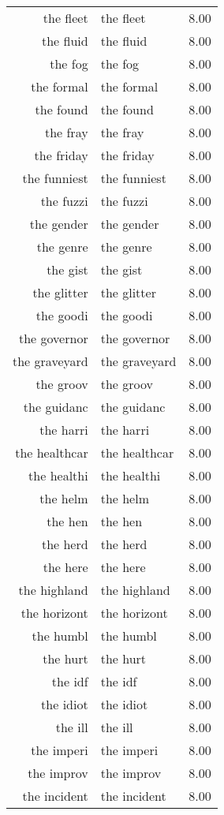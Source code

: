 \begin{table}[ht]
\begin{tabular}{rlr}
  the fleet & the fleet & 8.00 \\ 
  the fluid & the fluid & 8.00 \\ 
  the fog & the fog & 8.00 \\ 
  the formal & the formal & 8.00 \\ 
  the found & the found & 8.00 \\ 
  the fray & the fray & 8.00 \\ 
  the friday & the friday & 8.00 \\ 
  the funniest & the funniest & 8.00 \\ 
  the fuzzi & the fuzzi & 8.00 \\ 
  the gender & the gender & 8.00 \\ 
  the genre & the genre & 8.00 \\ 
  the gist & the gist & 8.00 \\ 
  the glitter & the glitter & 8.00 \\ 
  the goodi & the goodi & 8.00 \\ 
  the governor & the governor & 8.00 \\ 
  the graveyard & the graveyard & 8.00 \\ 
  the groov & the groov & 8.00 \\ 
  the guidanc & the guidanc & 8.00 \\ 
  the harri & the harri & 8.00 \\ 
  the healthcar & the healthcar & 8.00 \\ 
  the healthi & the healthi & 8.00 \\ 
  the helm & the helm & 8.00 \\ 
  the hen & the hen & 8.00 \\ 
  the herd & the herd & 8.00 \\ 
  the here & the here & 8.00 \\ 
  the highland & the highland & 8.00 \\ 
  the horizont & the horizont & 8.00 \\ 
  the humbl & the humbl & 8.00 \\ 
  the hurt & the hurt & 8.00 \\ 
  the idf & the idf & 8.00 \\ 
  the idiot & the idiot & 8.00 \\ 
  the ill & the ill & 8.00 \\ 
  the imperi & the imperi & 8.00 \\ 
  the improv & the improv & 8.00 \\ 
  the incident & the incident & 8.00 \\ 

\end{tabular}
\end{table}
